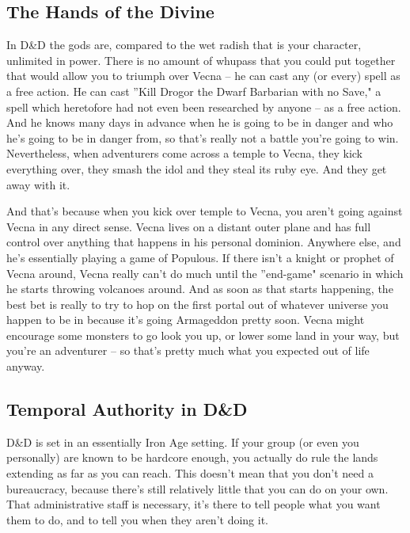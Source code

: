 \subsection{The Hands of the Divine}

In D\&D the gods are, compared to the wet radish that is your character, unlimited in power. There is no amount of whupass that you could put together that would allow you to triumph over Vecna -- he can cast any (or every) spell as a free action. He can cast ''Kill Drogor the Dwarf Barbarian with no Save," a spell which heretofore had not even been researched by anyone -- as a free action. And he knows many days in advance when he is going to be in danger and who he's going to be in danger from, so that's really not a battle you're going to win. Nevertheless, when adventurers come across a temple to Vecna, they kick everything over, they smash the idol and they steal its ruby eye. And they get away with it.

And that's because when you kick over temple to Vecna, you aren't going against Vecna in any direct sense. Vecna lives on a distant outer plane and has full control over anything that happens in his personal dominion. Anywhere else, and he's essentially playing a game of Populous. If there isn't a knight or prophet of Vecna around, Vecna really can't do much until the ''end-game" scenario in which he starts throwing volcanoes around. And as soon as that starts happening, the best bet is really to try to hop on the first portal out of whatever universe you happen to be in because it's going Armageddon pretty soon. Vecna might encourage some monsters to go look you up, or lower some land in your way, but you're an adventurer -- so that's pretty much what you expected out of life anyway.

\subsection{Temporal Authority in D\&D}
\vspace*{-8pt}

D\&D is set in an essentially Iron Age setting. If your group (or even you personally) are known to be hardcore enough, you actually do rule the lands extending as far as you can reach. This doesn't mean that you don't need a bureaucracy, because there's still relatively little that you can do on your own. That administrative staff is necessary, it's there to tell people what you want them to do, and to tell you when they aren't doing it.

